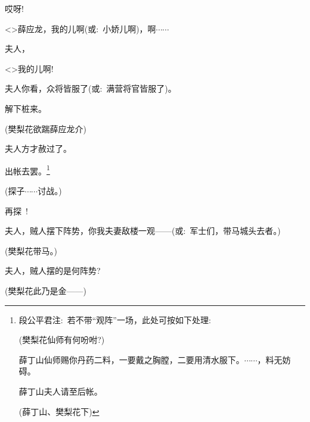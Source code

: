 {哎呀!



\textless{}\!\textgreater{}薛应龙，我的儿啊({\akai 或}:~小娇儿啊)，啊$\cdots{}\cdots{}$

夫人，

\textless{}\!\textgreater{}我的儿啊!

夫人你看，众将皆服了({\akai 或}:~满营将官皆服了)。


解下桩来。

(樊梨花{\hwfs 欲踹}薛应龙{\hwfs 介})

夫人方才赦过了。

出帐去罢。\footnote{段公平{\scriptsize 君}注:~若不带``{观阵}''一场，此处可按如下处理:~

\hspace*{-2pt}(樊梨花\hspace{18pt}仙师有何吩咐?)

薛丁山\hspace{20pt}仙师赐你丹药二料，一要戴之胸膛，二要用清水服下。$\cdots{}\cdots{}$，料无妨碍。

薛丁山\hspace{20pt}夫人请至后帐。

\hspace*{-2pt}(薛丁山、樊梨花{\hwfs 下}) }

(探子\hspace{30pt}$\cdots{}\cdots{}$讨战。)

再探~!

夫人，贼人摆下阵势，你我夫妻敌楼一观------({\akai 或}:~军士们，带马城头去者。)

(樊梨花\hspace{20pt}带马。)



夫人，贼人摆的是何阵势?

(樊梨花\hspace{20pt}此乃是金------)

}
